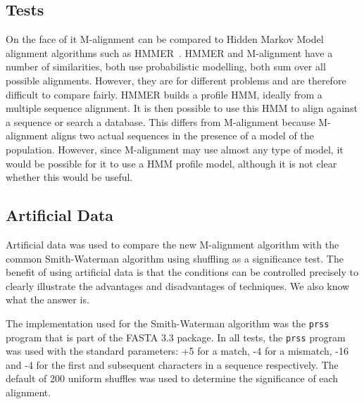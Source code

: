 \documentclass[letterpaper,11pt,oneside]{article}
\begin{document}
\begin{multicols}{2}

 





\section{Tests}

On the face of it M-alignment can be compared to Hidden Markov Model alignment
algorithms such as HMMER~\cite{eddy98}.  HMMER and M-alignment have a number
of similarities, both use probabilistic modelling, both sum over all possible
alignments.  However, they are for different problems and are therefore
difficult to compare fairly.  HMMER builds a profile HMM, ideally from a
multiple sequence alignment.  It is then possible to use this HMM to align
against a sequence or search a database.  This differs from M-alignment
because M-alignment aligns two actual sequences in the presence of a model of
the population.  However, since M-alignment may use almost any type of model,
it would be possible for it to use a HMM profile model, although it is not
clear whether this would be useful.


\subsection{Artificial Data}

Artificial data was used to compare the new M-alignment algorithm with the
common Smith-Waterman algorithm using shuffling as a significance test.  The
benefit of using artificial data is that the conditions can be controlled
precisely to clearly illustrate the advantages and disadvantages of
techniques.
We also know what the answer is.

The implementation used for the Smith-Waterman algorithm was the \verb!prss!
program that is part of the FASTA 3.3 package.  In all tests, the \verb!prss!
program was used with the standard parameters: +5 for a match, -4 for a
mismatch, -16 and -4 for the first and subsequent characters in a sequence
respectively.  The default of 200 uniform shuffles was used to determine the
significance of each alignment.


\end{multicols}
\end{document}
